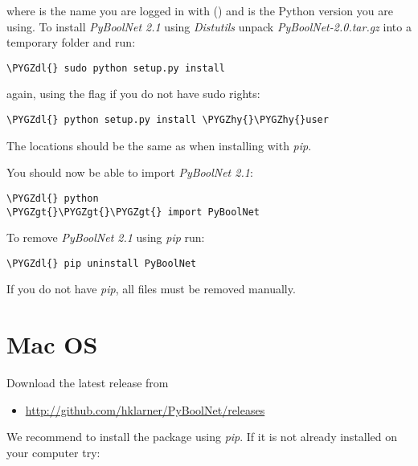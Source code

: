 \documentclass[letterpaper,10pt,english]{sphinxmanual}
\def\PYGZgt{\char`\>}
\def\PYGZdl{\char`\$}
\def\PYGZhy{\char`\-}
\begin{document}
where  is the name you are logged in with () and  is the Python version you are using.
To install \emph{PyBoolNet 2.1} using \emph{Distutils} unpack \emph{PyBoolNet-2.0.tar.gz} into a temporary folder and run:

\begin{Verbatim}[commandchars=\\\{\}]
\PYGZdl{} sudo python setup.py install
\end{Verbatim}

again, using the  flag if you do not have sudo rights:

\begin{Verbatim}[commandchars=\\\{\}]
\PYGZdl{} python setup.py install \PYGZhy{}\PYGZhy{}user
\end{Verbatim}

The locations should be the same as when installing with \emph{pip}.

You should now be able to import \emph{PyBoolNet 2.1}:

\begin{Verbatim}[commandchars=\\\{\}]
\PYGZdl{} python
\PYGZgt{}\PYGZgt{}\PYGZgt{} import PyBoolNet
\end{Verbatim}

To remove \emph{PyBoolNet 2.1} using \emph{pip} run:

\begin{Verbatim}[commandchars=\\\{\}]
\PYGZdl{} pip uninstall PyBoolNet
\end{Verbatim}

If you do not have \emph{pip}, all files must be removed manually.


\section{Mac OS}
\label{Installation:mac-os}
Download the latest release from
\begin{itemize}
\item {} 
\href{http://github.com/hklarner/PyBoolNet/releases}{http://github.com/hklarner/PyBoolNet/releases}

\end{itemize}

We recommend to install the package using \emph{pip}. If it is not already installed on your computer try:
\end{document}
